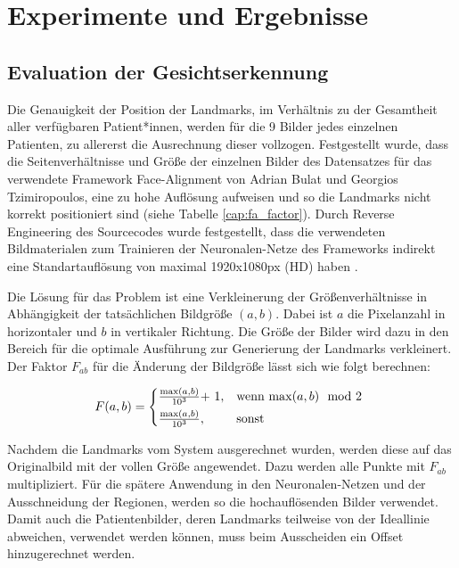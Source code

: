 
\chapter{Experimente und Ergebnisse}\label{experiment}

\section{Evaluation der Gesichtserkennung}\label{evalfa}
Die Genauigkeit der Position der Landmarks, im Verhältnis zu der Gesamtheit aller verfügbaren Patient*innen, werden für die 9 Bilder jedes einzelnen Patienten, zu allererst die Ausrechnung dieser vollzogen. Festgestellt wurde, dass die Seitenverhältnisse und Größe der einzelnen Bilder des Datensatzes für das verwendete Framework \glqq Face-Alignment\grqq{} von Adrian Bulat und Georgios Tzimiropoulos, eine zu hohe Auflösung aufweisen und so die Landmarks nicht korrekt positioniert sind (siehe Tabelle \ref{cap:fa_factor}). Durch Reverse Engineering des Sourcecodes wurde festgestellt, dass die verwendeten Bildmaterialen zum Trainieren der Neuronalen-Netze des Frameworks indirekt eine Standartauflösung von maximal 1920x1080px (HD) haben \cite{fa_framework}.


Die Lösung für das Problem ist eine Verkleinerung der Größenverhältnisse in Abhängigkeit der tatsächlichen Bildgröße $(a, b)$. Dabei ist $a$ die Pixelanzahl in horizontaler und $b$ in vertikaler Richtung. Die Größe der Bilder wird dazu in den Bereich für die optimale Ausführung zur Generierung der Landmarks verkleinert. Der Faktor $F_{ab}$ für die Änderung der Bildgröße lässt sich wie folgt berechnen:

\begin{equation}
F(a, b) = \begin{cases*}
  \frac{\max(a, b)}{10^{3}} $+ 1$,  & wenn $\max(a, b) \mod 2$  \\
  \frac{\max(a, b)}{10^{3}},        & sonst
\end{cases*}
\end{equation}

Nachdem die Landmarks vom System ausgerechnet wurden, werden diese auf das Originalbild mit der vollen Größe angewendet. Dazu werden alle Punkte mit $F_{ab}$ multipliziert. Für die spätere Anwendung in den Neuronalen-Netzen und der Ausschneidung der Regionen, werden so die hochauflösenden Bilder verwendet. Damit auch die Patientenbilder, deren Landmarks teilweise von der Ideallinie abweichen, verwendet werden können, muss beim Ausscheiden ein Offset hinzugerechnet werden.




